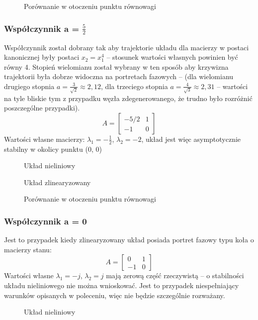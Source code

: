 \documentclass[a4paper, 10pt]{article}
\begin{document}
				
				\begin{figure}[H]
					\centering
					\def \svgwidth{0.7\columnwidth}
					
					\caption{Porównanie w otoczeniu punktu równowagi}
				\end{figure}\noindent
			\subsubsection{Współczynnik a = $\frac{5}{2}$}
				Współczynnik został dobrany tak aby trajektorie układu dla macierzy w postaci kanonicznej były postaci $x_2 = x_1^4$ -- stosunek wartości własnych powinien być równy 4. Stopień wielomianu został wybrany w ten sposób aby krzywizna trajektorii była dobrze widoczna na portretach fazowych -- (dla wielomianu drugiego stopnia $a=\frac{3}{\sqrt{2}} \approx 2,12$, dla trzeciego stopnia $a=\frac{4}{\sqrt{3}} \approx 2,31$ -- wartości na tyle bliskie tym z przypadku węzła zdegenerowanego, że trudno było rozróżnić poszczególne przypadki).
				$$
					A = \begin{bmatrix}
						-5/2 & 1 \\
						-1 & 0
					\end{bmatrix}
				$$
				Wartości własne macierzy: $\lambda_1 = -\frac{1}{2}$, $\lambda_2 = -2$, układ jest więc asymptotycznie stabilny w okolicy punktu (0, 0)
				\begin{figure}[H]
					\centering
					\def \svgwidth{0.75\columnwidth}
					
					\caption{Układ nieliniowy}
				\end{figure}\noindent
				\begin{figure}[H]
					\centering
					\def \svgwidth{0.75\columnwidth}
					
					\caption{Układ zlinearyzowany}
				\end{figure}\noindent

				\begin{figure}[H]
					\centering
					\def \svgwidth{0.75\columnwidth}
					
					\caption{Porównanie w otoczeniu punktu równowagi}
				\end{figure}\noindent

			\subsubsection{Współczynnik a = 0}
				Jest to przypadek kiedy zlinearyzowany układ posiada portret fazowy typu koła o macierzy stanu:
				$$
				A = \begin{bmatrix}
				0 & 1 \\
				-1 & 0
				\end{bmatrix}
				$$
				Wartości własne $\lambda_1 = -j$, $\lambda_2 = j$ mają zerową część rzeczywistą -- o stabilności układu nieliniowego nie można wnioskować. Jest to przypadek niespełniający warunków opisanych w poleceniu, więc nie będzie szczególnie rozważany.
				\begin{figure}[H]
					\centering
					\def \svgwidth{0.75\columnwidth}
					
					\caption{Układ nieliniowy}
				\end{figure}\noindent
\end{document}
